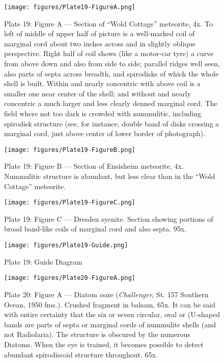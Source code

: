\documentclass[a4paper, 12pt, oneside]{article}
\begin{document}
\begin{figure}[b]
\centering
\texttt{[image: figures/Plate19-FigureA.png]}
\caption{\small Plate 19: Figure A --- Section of ``Wold Cottage'' meteorite, 4x. To left of middle of upper half of picture is a well-marked coil of marginal cord about two inches across and in slightly oblique perspective. Right half of coil shows (like a motor-car tyre) a curve from above down and also from side to side; parallel ridges well seen, also parts of septa across breadth, and spirodisks of which the whole shell is built. Within and nearly concentric with above coil is a smaller one near center of the shell; and without and nearly concentric a much larger and less clearly denned marginal cord. The field where not too dark is crowded with nummulitic, including spirodisk structure (see, for instance, double band of disks crossing a marginal cord, just above center of lower border of photograph).}
\end{figure}
\clearpage
\begin{figure}[b]
\centering
\texttt{[image: figures/Plate19-FigureB.png]}
\caption{\small Plate 19: Figure B --- Section of Ensisheim meteorite, 4x. Nummulitic structure is abundant, but less clear than in the ``Wold Cottage'' meteorite.}
\end{figure}
\clearpage
\begin{figure}[b]
\centering
\texttt{[image: figures/Plate19-FigureC.png]}
\caption{\small Plate 19: Figure C --- Dresden syenite. Section showing portions of broad band-like coils of marginal cord and also septa. 95x.}
\end{figure}
\clearpage
\begin{figure}[b]
\centering
\texttt{[image: figures/Plate19-Guide.png]}
\caption{\small Plate 19: Guide Diagram}
\end{figure}
\clearpage
{}
\cfoot{\thepage}
\begin{figure}[b]
\centering
\texttt{[image: figures/Plate20-FigureA.png]}
\caption{\small Plate 20: Figure A --- Diatom ooze (\emph{Challenger}, St. 157 Southern Ocean, 1950 fms.). Crushed fragment in balsam, 65x. It can be said with entire certainty that the six or seven circular, oval or (U-shaped bands are parts of septa or marginal cords of nummulite shells (and not Radiolaria). The structure is obscured by the numerous Diatoms. When the eye is trained, it becomes possible to detect abundant spirodiscoid structure throughout. 65x.}
\end{figure}
\end{document}
